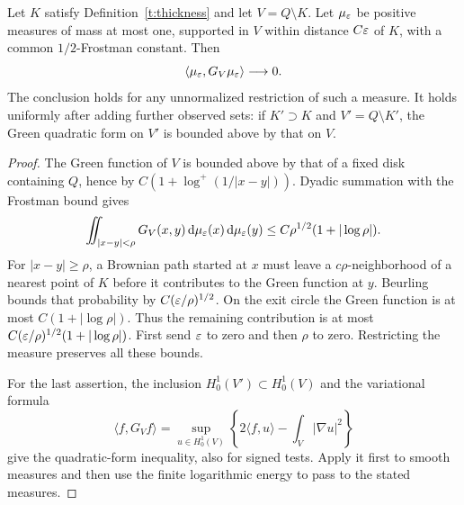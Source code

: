 \begin{proposition}
\label{t:boundary-variance}
Let $K$ satisfy Definition~\ref{t:thickness} and let $V=Q\setminus K$.
Let $\mu_\varepsilon$ be positive measures of mass at most one, supported in $V$
within distance $C\varepsilon$ of $K$, with a common $1/2$-Frostman constant.
Then
\begin{equation}\label{t:boundary-energy}
 \langle\mu_\varepsilon,G_V\mu_\varepsilon\rangle\longrightarrow0.
\end{equation}
The conclusion holds for any unnormalized restriction of such a measure.
It holds uniformly after adding further observed sets: if $K'\supset K$
and $V'=Q\setminus K'$, the Green quadratic form on $V'$ is bounded above
by that on $V$.
\end{proposition}
\begin{proof}
The Green function of $V$ is bounded above by that of a fixed disk
containing $Q$, hence by $C(1+\log^+(1/|x-y|))$.  Dyadic summation with
the Frostman bound gives
\[
 \iint_{|x-y|<\rho}G_V(x,y)\,\mathrm d\mu_\varepsilon(x)\,\mathrm d\mu_\varepsilon(y)
 \le C\rho^{1/2}(1+|\log\rho|).
\]
For $|x-y|\ge\rho$, a Brownian path started at $x$ must leave a
$c\rho$-neighborhood of a nearest point of $K$ before it contributes to
the Green function at $y$.  Beurling bounds that probability by
$C(\varepsilon/\rho)^{1/2}$.  On the exit circle the Green function is at most
$C(1+|\log\rho|)$.  Thus the remaining contribution is at most
$C(\varepsilon/\rho)^{1/2}(1+|\log\rho|)$.  First send $\varepsilon$ to zero and
then $\rho$ to zero.  Restricting the measure preserves all these bounds.

For the last assertion, the inclusion $H^1_0(V')\subset H^1_0(V)$ and
the variational formula
\[
 \langle f,G_Vf\rangle
 =\sup_{u\in H^1_0(V)}
       \left\{2\langle f,u\rangle-\int_V|\nabla u|^2\right\}
\]
give the quadratic-form inequality, also for signed tests.  Apply it
first to smooth measures and then use the finite logarithmic energy to
pass to the stated measures.
\end{proof}

